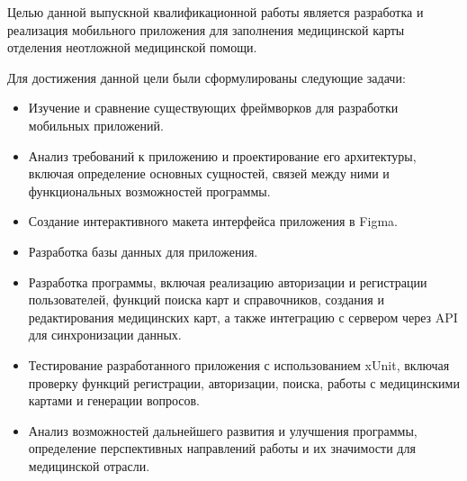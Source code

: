 Целью данной выпускной квалификационной работы является разработка и реализация мобильного приложения для заполнения медицинской карты отделения неотложной медицинской помощи.

Для достижения данной цели были сформулированы следующие задачи:
\begin{itemize}
    \item Изучение и сравнение существующих фреймворков для разработки мобильных приложений.

    \item Анализ требований к приложению и проектирование его архитектуры, включая определение основных сущностей, связей между ними и функциональных возможностей программы.

    \item Создание интерактивного макета интерфейса приложения в Figma.

    \item Разработка базы данных для приложения.
    
    \item Разработка программы, включая реализацию авторизации и регистрации пользователей, функций поиска карт и справочников, создания и редактирования медицинских карт, а также интеграцию с сервером через API для синхронизации данных.

    \item Тестирование разработанного приложения с использованием xUnit, включая проверку функций регистрации, авторизации, поиска, работы с медицинскими картами и генерации вопросов.

    \item Анализ возможностей дальнейшего развития и улучшения программы, определение перспективных направлений работы и их значимости для медицинской отрасли.
\end{itemize}